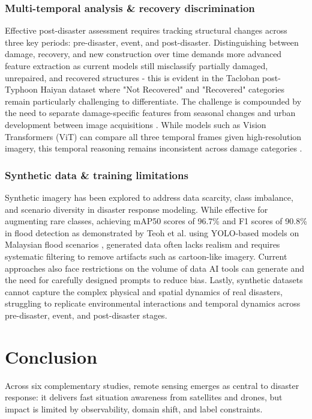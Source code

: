 \documentclass[conference,a4paper]{IEEEtran}
\begin{document}
\subsubsection{\textbf{Multi-temporal analysis \& recovery discrimination}}
Effective post-disaster assessment requires tracking structural changes across three key periods: pre-disaster, event, and post-disaster. Distinguishing between damage, recovery, and new construction over time demands more advanced feature extraction as current models still misclassify partially damaged, unrepaired, and recovered structures - this is evident in the Tacloban post-Typhoon Haiyan dataset where "Not Recovered" and "Recovered" categories remain particularly challenging to differentiate. The challenge is compounded by the need to separate damage-specific features from seasonal changes and urban development between image acquisitions \cite{kimDisasterAssessmentUsing2022}. While models such as Vision Transformers (ViT) can compare all three temporal frames given high-resolution imagery, this temporal reasoning remains inconsistent across damage categories \cite{lagapEnhancingPostDisasterDamage2025}.

\subsubsection{\textbf{Synthetic data \& training limitations}}
Synthetic imagery has been explored to address data scarcity, class imbalance, and scenario diversity in disaster response modeling. While effective for augmenting rare classes, achieving mAP50 scores of 96.7\% and F1 scores of 90.8\% in flood detection as demonstrated by Teoh et al. using YOLO-based models on Malaysian flood scenarios \cite{teohExploringGenerativeAI2024}, generated data often lacks realism and requires systematic filtering to remove artifacts such as cartoon-like imagery. Current approaches also face restrictions on the volume of data AI tools can generate and the need for carefully designed prompts to reduce bias. Lastly, synthetic datasets cannot capture the complex physical and spatial dynamics of real disasters, struggling to replicate environmental interactions and temporal dynamics across pre-disaster, event, and post-disaster stages.

\section{Conclusion}
Across six complementary studies, remote sensing emerges as central to disaster response: it delivers fast situation awareness from satellites and drones, but impact is limited by observability, domain shift, and label constraints.
\end{document}
